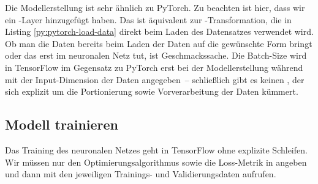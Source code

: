 
Die Modellerstellung ist sehr ähnlich zu PyTorch. Zu beachten ist hier, dass 
wir ein -Layer hinzugefügt haben. Das ist äquivalent zur 
-Transformation, die in Listing \ref{py:pytorch-load-data} direkt beim 
Laden des Datensatzes verwendet wird. 
Ob man die Daten bereits beim Laden der Daten auf die gewünschte Form bringt oder das 
erst im neuronalen Netz tut, ist Geschmackssache. 
Die Batch-Size wird in TensorFlow im Gegensatz zu PyTorch erst bei der Modellerstellung 
während  mit der Input-Dimension der Daten angegeben~-- schließlich gibt es 
keinen , der sich explizit um die Portionierung sowie Vorverarbeitung 
der Daten kümmert.

\vspace{2mm}

\subsection{Modell trainieren}

Das Training des neuronalen Netzes geht in TensorFlow ohne explizite Schleifen. 
Wir müssen nur den Optimierungsalgorithmus sowie die Loss-Metrik in  
angeben und dann  mit den jeweiligen Trainings- und 
Validierungsdaten aufrufen. 


\newpage

